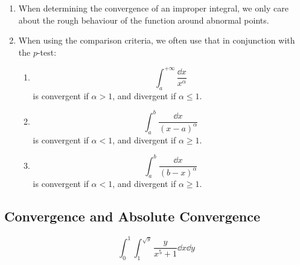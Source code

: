 \documentclass[12pt]{article}
\begin{document}
\begin{important}
    \begin{enumerate}
        \item When determining the convergence of an improper integral, we only care about the rough behaviour of the function around abnormal points.
        \item When using the comparison criteria, we often use that in conjunction with the $p$-test:
        \begin{enumerate}
            \item \begin{equation*}
                \int_a^{+\infty} \dfrac{\dd x}{x^\alpha}
            \end{equation*}
            is convergent if $\alpha > 1$, and divergent if $\alpha \leq 1$.
            \item \begin{equation*}
                \int_a^b \dfrac{\dd x}{(x-a)^\alpha}
            \end{equation*}
            is convergent if $\alpha < 1$, and divergent if $\alpha \geq 1$.
            \item \begin{equation*}
                \int_a^b \dfrac{\dd x}{(b-x)^\alpha}
            \end{equation*}
            is convergent if $\alpha < 1$, and divergent if $\alpha \geq 1$.
        \end{enumerate}
    \end{enumerate}
\end{important}
\subsection{Convergence and Absolute Convergence}
\begin{equation*}
    \boxed{\int_0^1 \int_1^{\sqrt{y}}\dfrac{y}{x^5+1}\dd x \dd y}
\end{equation*}
\end{document}
